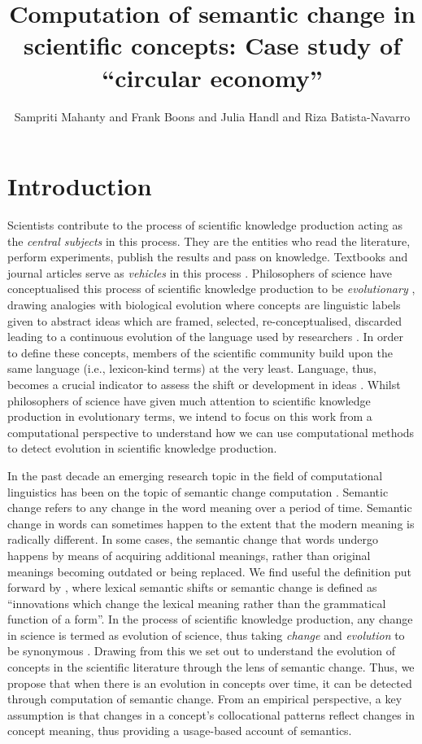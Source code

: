 \documentclass[output=paper]{langsci/langscibook}
\author{Sampriti Mahanty\affiliation{University of Manchester} and
Frank Boons\affiliation{University of Manchester} and
Julia Handl\affiliation{University of Manchester} and
Riza Batista-Navarro\affiliation{University of Manchester}
}
\title[Computation of semantic change in scientific concepts]
      {Computation of semantic change in scientific concepts: Case study of ``circular economy''}
\begin{document}
\maketitle

\section{Introduction}
Scientists contribute to the process of scientific knowledge production acting as the \textit{central subjects} in this process. They are the entities who read the literature, perform experiments, publish the results and pass on knowledge. Textbooks and journal articles serve as \textit{vehicles} in this process \citep{hull1988science}. Philosophers of science have conceptualised this process of scientific knowledge production to be \textit{evolutionary} \citep{toulmin1972human,hull1988science}, drawing analogies with biological evolution where concepts are linguistic labels given to abstract ideas \citep{fodor1975language,pinker1994language} which are framed, selected, re-conceptualised, discarded leading to a continuous evolution of the language used by researchers \citep{boons2017industrial}. In order to define these concepts, members of the scientific community build upon the same language (i.e., lexicon-kind terms) at the very least. Language, thus, becomes a crucial indicator to assess the shift or development in ideas \citep{kuhn1990road}. Whilst philosophers of science have given much attention to scientific knowledge production in evolutionary terms, we intend to focus on this work from a computational perspective to understand how we can use computational methods to detect evolution in scientific knowledge production.

In the past decade an emerging research topic in the field of computational linguistics has been on the topic of semantic change computation \citep{tang2018state}. Semantic change refers to any change in the word meaning over a period of time.  Semantic change in words can sometimes happen to the extent that the modern meaning is radically different. In some cases, the semantic change that words undergo happens by means of acquiring additional meanings, rather than original meanings becoming outdated or being replaced. We find useful the definition put forward by \citet{bloomfield-1933}, where lexical semantic shifts or semantic change is defined as ``innovations which change the lexical meaning rather than the grammatical function of a form''. In the process of scientific knowledge production, any change in science is termed as evolution of science, thus taking \textit{change} and \textit{evolution} to be synonymous \citep{wuketits1984evolutionary,bradie1986assessing}. Drawing from this we set out to understand the evolution of concepts in the scientific literature through the lens of semantic change. Thus, we propose that when there is an evolution in concepts over time, it can be detected through computation of semantic change. From an empirical perspective, a key assumption is that changes in a concept's collocational patterns reflect changes in concept meaning, thus providing a usage-based account of semantics.
\end{document}
